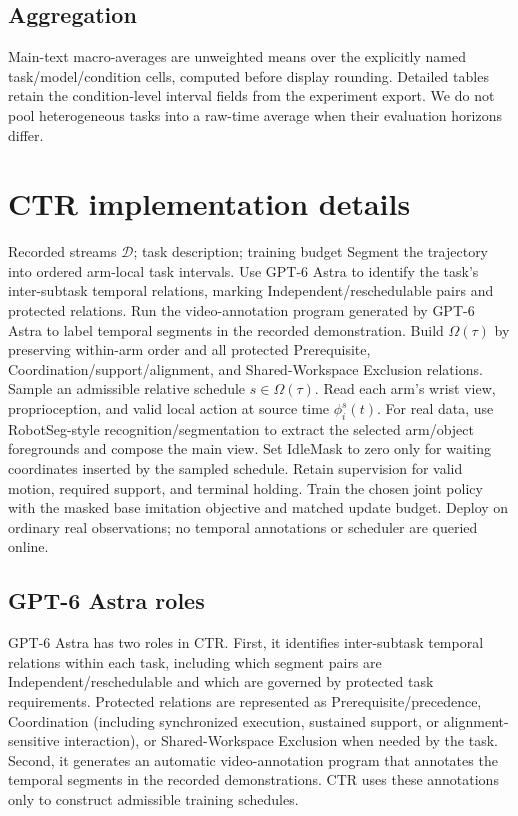 \subsection{Aggregation}
Main-text macro-averages are unweighted means over the explicitly named task/model/condition cells, computed before display rounding. Detailed tables retain the condition-level interval fields from the experiment export. We do not pool heterogeneous tasks into a raw-time average when their evaluation horizons differ.

\section{CTR implementation details}
\label{app:implementation}

\begin{algorithm}[ht]
\caption{CTR data-construction algorithm}
\label{alg:ctr}
\begin{algorithmic}[1]
\REQUIRE Recorded streams $\mathcal D$; task description; training budget
\STATE Segment the trajectory into ordered arm-local task intervals.
\STATE Use GPT-6 Astra to identify the task's inter-subtask temporal relations, marking Independent/reschedulable pairs and protected relations.
\STATE Run the video-annotation program generated by GPT-6 Astra to label temporal segments in the recorded demonstration.
\STATE Build $\Omega(\tau)$ by preserving within-arm order and all protected Prerequisite, Coordination/support/alignment, and Shared-Workspace Exclusion relations.
\STATE Sample an admissible relative schedule $s\in\Omega(\tau)$.
\STATE Read each arm's wrist view, proprioception, and valid local action at source time $\phi_i^s(t)$.
\STATE For real data, use RobotSeg-style recognition/segmentation to extract the selected arm/object foregrounds and compose the main view.
\STATE Set IdleMask to zero only for waiting coordinates inserted by the sampled schedule.
\STATE Retain supervision for valid motion, required support, and terminal holding.
\ENDFOR
\ENDFOR
\STATE Train the chosen joint policy with the masked base imitation objective and matched update budget.
\STATE Deploy on ordinary real observations; no temporal annotations or scheduler are queried online.
\end{algorithmic}
\end{algorithm}

\subsection{GPT-6 Astra roles}
GPT-6 Astra has two roles in CTR. First, it identifies inter-subtask temporal relations within each task, including which segment pairs are Independent/reschedulable and which are governed by protected task requirements. Protected relations are represented as Prerequisite/precedence, Coordination (including synchronized execution, sustained support, or alignment-sensitive interaction), or Shared-Workspace Exclusion when needed by the task. Second, it generates an automatic video-annotation program that annotates the temporal segments in the recorded demonstrations. CTR uses these annotations only to construct admissible training schedules.


